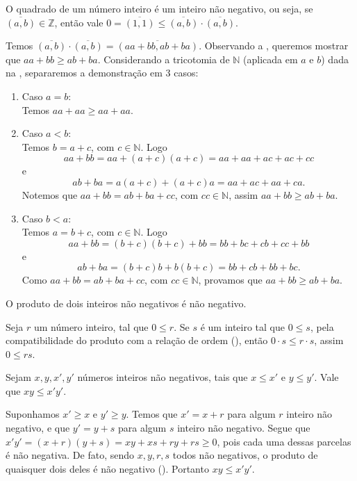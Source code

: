 \documentclass[../main.tex]{subfiles}
\begin{document}
\begin{prop}\label{int-prop-quadradoPositivo}
    O quadrado de um número inteiro é um inteiro não negativo, ou seja, se $\overline{(a,b)} \in \mathbb{Z}$, então vale $0 = \overline{(1,1)} \leq \overline{(a,b)} \cdot \overline{(a,b)}$. 
\end{prop}
\begin{dem}
    Temos $\overline{(a,b)} \cdot \overline{(a,b)} = \overline{(aa + bb, ab+ba)}$. Observando a , queremos mostrar que $aa+bb \geq ab+ba$. Considerando a tricotomia de $\mathbb{N}$ (aplicada em $a$ e $b$) dada na , separaremos a demonstração em 3 casos:
    \begin{enumerate}[label=(\roman*)]
        \item Caso $a=b$: \\
        Temos $aa+aa \geq aa+aa$.

        \item Caso $a < b$: \\
        Temos $b = a+c$, com $c \in \mathbb{N}$. Logo \\
        \[ aa+bb = aa+(a+c)(a+c) = aa+aa+ac+ac+cc \] 
        e
        \[ ab+ba = a(a+c)+(a+c)a = aa+ac+aa+ca. \]
        Notemos que $aa+bb = ab+ba+cc$, com $cc \in \mathbb{N}$, assim $aa+bb \geq ab+ba$.

        \item Caso $b < a$: \\
        Temos $a = b+c$, com $c \in \mathbb{N}$. Logo
        \[ aa+bb = (b+c)(b+c) + bb = bb+bc+cb+cc+bb \]
        e
        \[ ab+ba = (b+c)b+b(b+c) = bb+cb+bb+bc. \]
        Como $aa+bb = ab+ba+cc$, com $cc \in \mathbb{N}$, provamos que $aa+bb \geq ab+ba$.
    \end{enumerate}
\end{dem}

\begin{prop}\label{int-prop-produtoPositivo}
    O produto de dois inteiros não negativos é não negativo.
\end{prop}
\begin{dem}
    Seja $r$ um número inteiro, tal que $0 \leq r$. Se $s$ é um inteiro tal que $0 \leq s$, pela compatibilidade do produto com a relação de ordem (), então $0 \cdot s \leq r \cdot s$, assim $0 \leq rs$.
\end{dem}
\begin{prop}\label{int-prop-produtoMaiores}
    Sejam $x, y, x', y'$ números inteiros não negativos, tais que $x \leq x'$ e $y \leq y'$. Vale que $xy \leq x'y'$.
\end{prop}
\begin{dem}
    Suponhamos $x' \geq x $ e $y' \geq y$. Temos que  $x' = x + r$ para algum $r$ inteiro não negativo, e que $y' = y+s$ para algum $s$ inteiro não negativo.
    Segue que $ x'y' = (x+r)(y+s) = xy+xs+ry+rs \geq 0$, pois cada uma dessas parcelas é não negativa. De fato, sendo $x,y,r,s$ todos não negativos,  o produto de quaisquer dois deles é não negativo (). Portanto $xy \leq x'y'$.
\end{dem}
\end{document}
